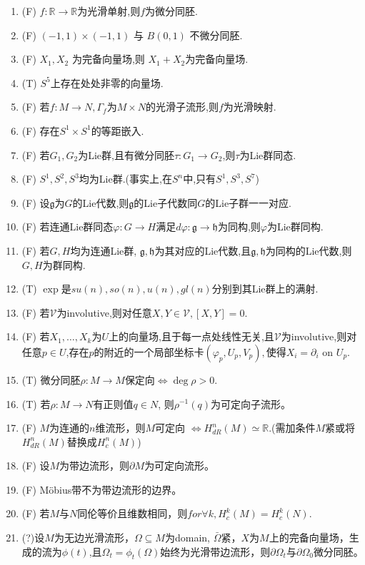 \documentclass{ctexart}
\numberwithin{equation}{section}
\theoremstyle{plain}
\theoremstyle{plain}
\numberwithin{equation}{section}
\theoremstyle{remark}
\begin{document}
\begin{enumerate}
	\item (F) $f:\mathbb{R}\rightarrow \mathbb{R}$为光滑单射,则$f$为微分同胚.
	\item (F) $(-1,1) \times (-1,1)$ 与 $B(0,1)$ 不微分同胚.
	\item (F) $X_1,X_2$ 为完备向量场,则 $X_1+X_2$为完备向量场.
	\item (T) $S^5$上存在处处非零的向量场.
	\item (F) 若$f:M\rightarrow N, \Gamma_f$为$M \times N$的光滑子流形,则$f$为光滑映射.
	\item (F) 存在$S^1 \times S^1$的等距嵌入.
	\item (F) 若$G_1, G_2$为Lie群,且有微分同胚$\tau : G_1 \rightarrow G_2$,则$\tau$为Lie群同态.
	\item (F) $S^1,S^2,S^3$均为Lie群.(事实上,在$S^n$中,只有$S^1,S^3,S^7$)
	\item (F) 设$\mathfrak{g}$为$G$的Lie代数,则$\mathfrak{g}$的Lie子代数同$G$的Lie子群一一对应.
	\item (F) 若连通Lie群同态$\varphi:G \rightarrow H$满足$d\varphi :\mathfrak{g} \rightarrow \mathfrak{h}$为同构,则$\varphi$为Lie群同构.
	\item (F) 若$G,H$均为连通Lie群, $\mathfrak{g},\mathfrak{h}$为其对应的Lie代数,且$\mathfrak{g},\mathfrak{h}$为同构的Lie代数,则$G,H$为群同构.
	\item (T) $\exp$是$su(n),so(n),u(n),gl(n)$分别到其Lie群上的满射.
	\item (F) 若$\mathcal{V}$为involutive,则对任意$X,Y \in \mathcal{V}, [X,Y]=0$.
	\item (F) 若$X_1, \ldots,X_k$为$U$上的向量场,且于每一点处线性无关,且$\mathcal{V}$为involutive,则对任意$p \in U$,存在$p$的附近的一个局部坐标卡$(\varphi_p, U_p, V_p), $使得$X_i=\partial_i$ on $U_p$.
	\item (T) 微分同胚$\rho :M \rightarrow M$保定向$\Leftrightarrow \deg \rho >0$.
	\item (T) 若$\rho:M \rightarrow N$有正则值$q \in N$, 则$\rho^{-1}(q)$为可定向子流形。
	\item (F) $M$为连通的$n$维流形，则$M$可定向 $\Leftrightarrow H_{dR}^n(M) \simeq \mathbb{R}$.(需加条件$M$紧或将$H_{dR}^n(M)$替换成$H_{c}^n(M)$)
	\item (F) 设$M$为带边流形，则$\partial M$为可定向流形。
	\item (F) M\"{o}bius带不为带边流形的边界。
	\item (F) 若$M$与$N$同伦等价且维数相同，则$for \forall k, H^k_c(M)=H^k_c(N)$.
	\item (?)设$M$为无边光滑流形，$\Omega \subseteq M$为domain, $\bar{\Omega}$紧，$X$为$M$上的完备向量场，生成的流为$\phi (t)$,且$\Omega_t = \phi_t(\Omega)$始终为光滑带边流形，则$\partial \Omega_t$与$\partial \Omega_0$微分同胚。

\end{enumerate}
\end{document}
